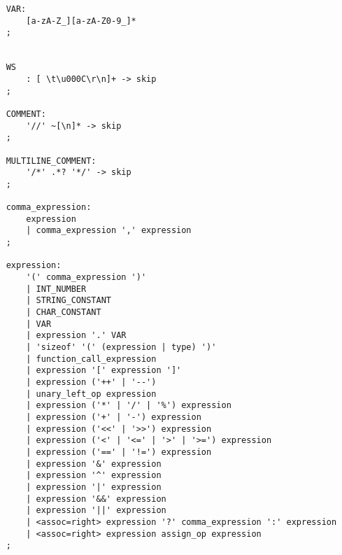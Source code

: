 \documentclass[12pt]{article}
\begin{document}
\begin{verbatim}
    VAR:
        [a-zA-Z_][a-zA-Z0-9_]*
    ;
    
    
    WS
        : [ \t\u000C\r\n]+ -> skip
    ;
    
    COMMENT:
        '//' ~[\n]* -> skip
    ;
    
    MULTILINE_COMMENT:
        '/*' .*? '*/' -> skip
    ;
    
    comma_expression:
        expression
        | comma_expression ',' expression
    ;
    
    expression:
        '(' comma_expression ')'
        | INT_NUMBER
        | STRING_CONSTANT
        | CHAR_CONSTANT
        | VAR
        | expression '.' VAR
        | 'sizeof' '(' (expression | type) ')'
        | function_call_expression
        | expression '[' expression ']'
        | expression ('++' | '--')
        | unary_left_op expression
        | expression ('*' | '/' | '%') expression
        | expression ('+' | '-') expression
        | expression ('<<' | '>>') expression
        | expression ('<' | '<=' | '>' | '>=') expression
        | expression ('==' | '!=') expression
        | expression '&' expression
        | expression '^' expression
        | expression '|' expression
        | expression '&&' expression
        | expression '||' expression
        | <assoc=right> expression '?' comma_expression ':' expression
        | <assoc=right> expression assign_op expression
    ;
    \end{verbatim}
    
    
\end{document}
